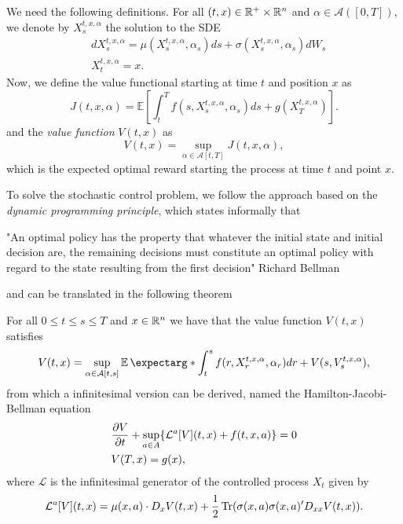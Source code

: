 We need the following definitions. For all $(t,x)\in \mathbb{R}^{+}\times \mathbb{R}^n$ and $\alpha \in \mathcal{A}([0,T])$, we denote by $X_s^{t,x,\alpha}$ the solution to the SDE
\begin{equation}
	\begin{split}
	&dX_{s}^{t,x,\alpha}=\mu(X_{s}^{t,x,\alpha},\alpha_s)ds+\sigma(X_{s}^{t,x,\alpha},\alpha_s)dW_s\\
	&X_t^{t,x,\alpha}=x.
	\end{split}
\end{equation}
Now, we define the value functional starting at time $t$ and position $x$ as
\begin{equation}
	J(t,x,\alpha)=\mathbb{E}\left[\int_{t}^{T}f(s,X_s^{t,x,\alpha},\alpha_s) ds +g(X_T^{t,x,\alpha})\right].
\end{equation}
and the \textit{value function} $V(t,x)$ as
\begin{equation}
	V(t,x)=\sup_{\alpha\in\mathcal{A}[t,T]}J(t,x,\alpha),
\end{equation}
which is the expected optimal reward starting the process at time $t$ and point $x$.

To solve the stochastic control problem, we follow the approach based on the \textit{dynamic programming principle}, which states informally that 

\begin{center}
	"An optimal policy has the
	property that whatever the
	initial state and initial decision are, the remaining decisions must constitute an
	optimal policy with regard
	to the state resulting from
	the first decision"
	Richard Bellman
\end{center}
and can be translated in the following theorem
\begin{thm}
	For all $0\leq t\leq s\leq T$ and $x\in\mathbb{R}^n$ we have that the value function $V(t,x)$ satisfies 
	\begin{equation}
		V(t,x)=\sup_{\alpha\in \mathcal{A}[t,s]}\expect*{\int_{t}^{s}f(r,X_r^{t,x,\alpha},\alpha_r)dr+V(s,V_s^{t,x,\alpha})},
	\end{equation}
from which a infinitesimal version can be derived, named the Hamilton-Jacobi-Bellman equation 
\begin{equation}
	\begin{split}
		&\frac{\partial V}{\partial t}+\sup_{a\in A}\{\mathcal{L}^a[V](t,x)+f(t,x,a)\}=0\\
		&V(T,x)=g(x),
	\end{split}
\end{equation}
where $\mathcal{L}$ is the infinitesimal generator of the controlled process $X_t$ given by
\begin{equation}
	\mathcal{L}^a[V](t,x)=\mu(x,a)\cdot D_x V(t,x)+\frac{1}{2}\operatorname{Tr}(\sigma(x,a)\sigma(x,a)'D_{xx}V(t,x)).
\end{equation}
\end{thm}


